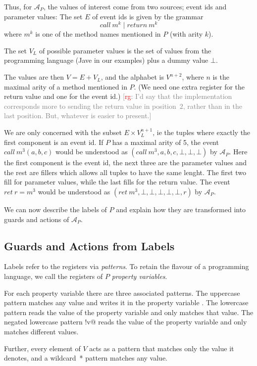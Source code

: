 \documentclass[9pt, preprint]{sigplanconf} %
\newcommand{\noterg}[2]{\textcolor{gray}{[\textcolor{red}{#1}: #2]}}
\newcommand{\rg}[1]{\noterg{rg}{#1}}
\newcommand{\A}{\ensuremath{\mathcal{A}}}
\theoremstyle{definition}
\theoremstyle{remark}
\begin{document}
Thus, for $\A_P$, the values of interest come from two
sources; event ids and parameter values: The set $E$ of event ids is given by
the grammar
\[
call\ m^k \mid return\ m^k
\]
where $m^k$ is one of the method names mentioned in $P$ (with arity $k$).

The set $V_L$ of possible parameter values is the set of values from
the programming language (Jave in our examples)
plus a dummy value $\bot$.

The values are then $V = E + V_L$, and the alphabet is $V^{n+2}$,
where $n$ is the maximal arity of a method mentioned in $P$.
(We need one extra register for the return value and one for the event
id.)
\rg{I'd say that the implementation corresponds more to sending the return value in position~$2$, rather than in the last position. But, whatever is easier to present.}

We are only concerned with the subset $E \times V_L^{n+1}$, ie the
tuples where exactly the first component is an event
id. If $P$ has a maximal arity of 5, the event $call\ m^3(a, b, c)$
would be understood as $(call\ m^3,  a, b, c, \bot, \bot, \bot)$ by
$\A_P$. Here the first component is the event id, the next three are the parameter values and the rest are
fillers which allows all tuples to have the same lenght. The first two
fill for parameter values, while the last fills for the return
value. The event $ret\ r = m^3$
would be understood as $(ret\ m^3,  \bot, \bot, \bot, \bot, \bot, r)$ by
$\A_P$.

We can now describe the labels of $P$ and explain how they are transformed into guards and
actions of $\A_P$.

\subsection{Guards and Actions from Labels}

Labels refer to the registers via \emph{patterns}. To retain the
flavour of a programming language, we call the registers of $P$
\emph{property variables}.

For each property variable \Verb@v@ there are three associated patterns.
The uppercase pattern \Verb@V@ matches any value and writes it in the property variable \Verb@v@.
The lowercase pattern \Verb@v@ reads the value of the property variable \Verb@v@ and only matches that value.
The negated lowercase pattern \Verb@!v@ reads the value of the
property variable \Verb@v@ and only matches different values.

Further, every element of $V$ acts as a pattern that matches only the value it denotes,
and a wildcard~* pattern matches any value.
\end{document}
